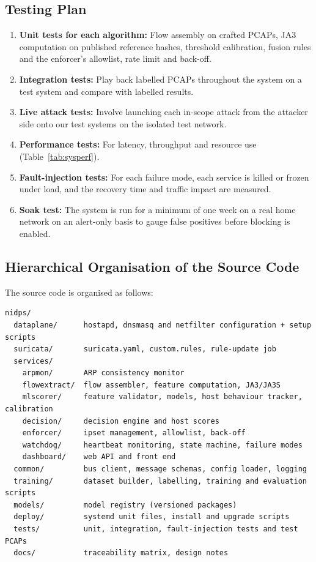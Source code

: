 \subsection{Testing Plan}\label{sec:6.6.6}
\begin{enumerate}
    \item \textbf{Unit tests for each algorithm:} Flow assembly on crafted PCAPs, JA3 computation on published reference hashes, threshold calibration, fusion rules and the enforcer's allowlist, rate limit and back-off.
    \item \textbf{Integration tests:} Play back labelled PCAPs throughout the system on a test system and compare with labelled results.
    \item \textbf{Live attack tests:} Involve launching each in-scope attack from the attacker side onto our test systems on the isolated test network.
    \item \textbf{Performance tests:} For latency, throughput and resource use (Table~\ref{tab:sysperf}).
    \item \textbf{Fault-injection tests:} For each failure mode, each service is killed or frozen under load, and the recovery time and traffic impact are measured.
    \item \textbf{Soak test:} The system is run for a minimum of one week on a real home network on an alert-only basis to gauge false positives before blocking is enabled.
\end{enumerate}

\subsection{Hierarchical Organisation of the Source Code}\label{sec:6.6.7}
\noindent The source code is organised as follows:
{\footnotesize
\begin{verbatim}
nidps/
  dataplane/      hostapd, dnsmasq and netfilter configuration + setup scripts
  suricata/       suricata.yaml, custom.rules, rule-update job
  services/
    arpmon/       ARP consistency monitor
    flowextract/  flow assembler, feature computation, JA3/JA3S
    mlscorer/     feature validator, models, host behaviour tracker, calibration
    decision/     decision engine and host scores
    enforcer/     ipset management, allowlist, back-off
    watchdog/     heartbeat monitoring, state machine, failure modes
    dashboard/    web API and front end
  common/         bus client, message schemas, config loader, logging
  training/       dataset builder, labelling, training and evaluation scripts
  models/         model registry (versioned packages)
  deploy/         systemd unit files, install and upgrade scripts
  tests/          unit, integration, fault-injection tests and test PCAPs
  docs/           traceability matrix, design notes
\end{verbatim}
}

